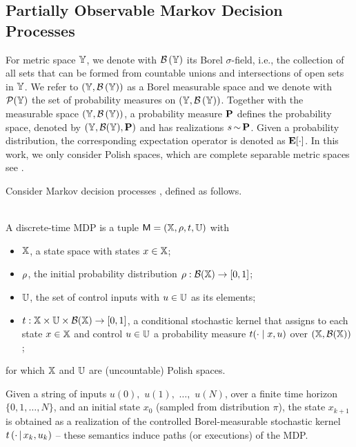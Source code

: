 \documentclass{ifacconf}
\begin{document}
\subsection{Partially Observable Markov  Decision Processes}
For metric space ${\mathbb{Y}}$, we denote with  $\mathcal{B}\left({\mathbb{Y}}\right)$ its Borel $\sigma$-field, i.e., the  
collection of all sets that can be formed from countable unions and intersections of open sets in ${\mathbb{Y}}$.
We refer to  $({\mathbb{Y}},\mathcal{B}\left({\mathbb{Y}}\right))$ as a Borel measurable space and we denote with $\mathcal P({\mathbb{Y}})$ the set of probability measures on $({\mathbb{Y}},\mathcal{B}\left({\mathbb{Y}}\right))$.
Together with the measurable space $({\mathbb{Y}},\mathcal{B}\left({\mathbb{Y}}\right))$,  a probability measure $\mathbf{P}$ defines the probability space, denoted by $({\mathbb{Y}},\mathcal{B}({\mathbb{Y}}),\mathbf{P})$ and has realizations  $s{\,\sim\,}\mathbf{P}$.     Given a probability distribution, the corresponding expectation operator is denoted as  $\mathbf{E}[\cdot]$.
In this work,  we only consider Polish spaces, which are complete separable metric spaces see \citep{bogachev2007measure}. 



    
Consider Markov decision processes \citep{Bertsekas2012,mt1993,hll1996}, defined as follows.%
\begin{definition}\label{def:MDP} \mbox{ }\\
  A discrete-time MDP is a tuple $\mathsf{M} = ({\mathbb{X}}, \rho, t, {\mathbb{U}})$ with
  \begin{itemize}
    \item ${\mathbb{X}}$,  a state space with states $x\in{\mathbb{X}}$; %
    \item $\rho$, the initial probability distribution $\rho:\mathcal{B}({\mathbb{X}})\rightarrow [0,1]$;
    \item ${\mathbb{U}}$, the set of control inputs with $u\in{\mathbb{U}}$ as its elements;
    \item $t:{\mathbb{X}}\times{\mathbb{U}}\times\mathcal B({\mathbb{X}})\rightarrow[0,1]$, a conditional stochastic kernel that assigns to each state $x\in {\mathbb{X}}$ and control $u\in {\mathbb{U}}$ a probability measure $t(\cdot\mid x,u)$ over $({\mathbb{X}},\mathcal B({\mathbb{X}}))$;
  \end{itemize}
  for which ${\mathbb{X}}$ and ${\mathbb{U}}$ are (uncountable) Polish spaces.
 \end{definition}
Given a string of inputs
$u(0),$ $u(1), $ $\ldots, $ $u(N)$,
over a finite time horizon $\{0,1,\ldots, N\}$,
and an initial state  $x_0$ (sampled from distribution $\pi$),
the state $x_{k+1}$
is obtained as a realization of the controlled Borel-measurable stochastic kernel $t\left(\cdot{\,\mid\,} x_k, u_k \right)$ --
these semantics induce paths (or executions) of the MDP.
 
\end{document}
